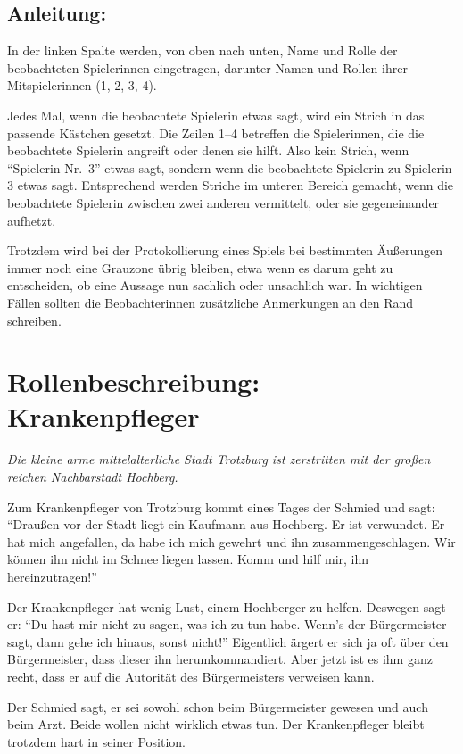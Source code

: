 \subsection*{Anleitung:}
In der linken Spalte werden, von oben nach unten, Name und Rolle der beobachteten Spielerinnen eingetragen, darunter Namen und Rollen ihrer Mitspielerinnen (1, 2, 3, 4).

Jedes Mal, wenn die beobachtete Spielerin etwas sagt, wird ein Strich in das passende Kästchen gesetzt. Die Zeilen 1--4 betreffen die Spielerinnen, die die beobachtete Spielerin angreift oder denen sie hilft. Also kein Strich, wenn "`Spielerin Nr.~3"' etwas sagt, sondern wenn die beobachtete Spielerin zu Spielerin 3 etwas sagt. Entsprechend werden Striche im unteren Bereich gemacht, wenn die beobachtete Spielerin zwischen zwei anderen vermittelt, oder sie gegeneinander aufhetzt.

Trotzdem wird bei der Protokollierung eines Spiels bei bestimmten Äußerungen immer noch eine Grauzone übrig bleiben, etwa wenn es darum geht zu entscheiden, ob eine Aussage nun sachlich oder unsachlich war. In wichtigen Fällen sollten die Beobachterinnen zusätzliche Anmerkungen an den Rand schreiben.
\newpage

\label{trotzburg-rollen}
\section*{Rollenbeschreibung: Krankenpfleger}

\emph{Die kleine arme mittelalterliche Stadt Trotzburg ist zerstritten mit der großen reichen Nachbarstadt Hochberg.}

Zum Krankenpfleger von Trotzburg kommt eines Tages der Schmied und sagt: "`Draußen vor der Stadt liegt ein Kaufmann aus Hochberg. Er ist verwundet. Er hat mich angefallen, da habe ich mich gewehrt und ihn zusammengeschlagen. Wir können ihn nicht im Schnee liegen lassen. Komm und hilf mir, ihn hereinzutragen!"'

Der Krankenpfleger hat wenig Lust, einem Hochberger zu helfen. Deswegen sagt er: "`Du hast mir nicht zu sagen, was ich zu tun habe. Wenn's der Bürgermeister sagt, dann gehe ich hinaus, sonst nicht!"' Eigentlich ärgert er sich ja oft über den Bürgermeister, dass dieser ihn herumkommandiert. Aber jetzt ist es ihm ganz recht, dass er auf die Autorität des Bürgermeisters verweisen kann.

Der Schmied sagt, er sei sowohl schon beim Bürgermeister gewesen und auch beim Arzt. Beide wollen nicht wirklich etwas tun. Der Krankenpfleger bleibt trotzdem hart in seiner Position.

